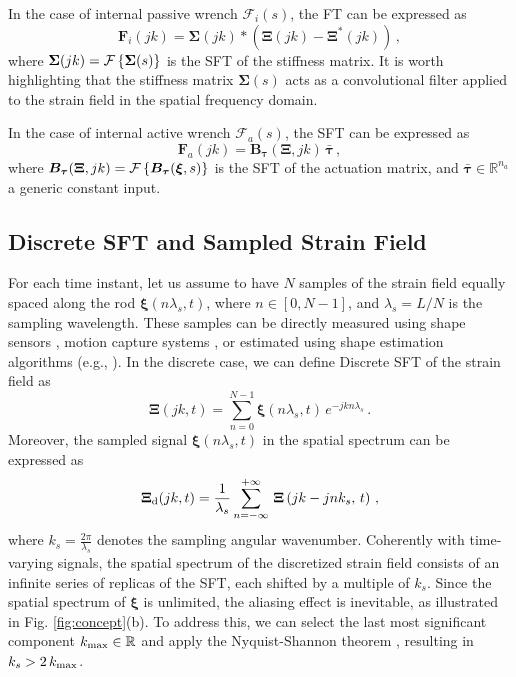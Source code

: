 In the case of internal passive wrench $\bm{\mathcal{F}}_i(s)$, the \ac{FT} can be expressed as
\begin{equation} \label{eq:internal_passive_static_ft}
    \bm{F}_i(j k) = \bm{\Sigma}(jk) \ast \left(\bm{\Xi}(jk) - \bm{\Xi}^{*}(jk) \right) \, ,
\end{equation}
where $\bm{\Sigma}(jk) = \mathcal{F}\left\{\bm{\Sigma}(s)\right\}$ is the \ac{SFT} of the stiffness matrix. It is worth highlighting that the stiffness matrix $\bm{\Sigma}(s)$ acts as a convolutional filter applied to the strain field in the spatial frequency domain.

In the case of internal active wrench $\bm{\mathcal{F}}_a(s)$, the \ac{SFT} can be expressed as
\begin{equation}
    \bm{F}_a(j k) = \bm{B}_{\bm{\tau}}(\bm{\Xi}, jk) \, \bar{\bm{\tau}} \, ,
\end{equation}
where $\bm{B}_{\bm{\tau}}(\bm{\Xi}, jk) = \mathcal{F}\left\{\bm{B}_{\bm{\tau}}(\bm{\xi}, s)\right\}$ is the \ac{SFT} of the actuation matrix, and $\bar{\bm{\tau}} \in \mathbb{R}^{n_a}$ a generic constant input.

\subsection{Discrete \ac{SFT} and Sampled Strain Field}
For each time instant, let us assume to have $N$ samples of the strain field equally spaced along the rod $\bm{\xi}(n \lambda_s, t)$, where $n \in [0, N - 1]$, and $\lambda_s = L / N$ is the sampling wavelength. These samples can be directly measured using shape sensors \cite{floris2021fiber}, motion capture systems \cite{field2009motion}, or estimated using shape estimation algorithms (e.g., \cite{lilge2022continuum}).
%
In the discrete case, we can define Discrete \ac{SFT} of the strain field as
\begin{equation} \label{eq:discrete_spatial_fourier_transform}
    \bm{\Xi}(jk, t) = \sum_{n = 0}^{N - 1} \bm{\xi}(n \lambda_s, t) \, e^{-jk n \lambda_s} \, . 
\end{equation}
%
Moreover, the sampled signal $\bm{\xi}(n \lambda_s, t)$ in the spatial spectrum can be expressed as
\begin{equation} \label{eq:repetition_spectrum}
    \bm{\Xi}_{\textnormal{d}}(jk, t) = \frac{1}{\lambda_s} \sum_{n = - \infty}^{+ \infty} \, \bm{\Xi}\left(jk - j n k_s, \, t\right) \, ,
\end{equation}
where $k_s = \frac{2 \pi}{\lambda_s}$ denotes the sampling angular wavenumber. Coherently with time-varying signals, the spatial spectrum of the discretized strain field consists of an infinite series of replicas of the \ac{SFT}, each shifted by a multiple of $k_s$. Since the spatial spectrum of $\bm{\xi}$ is unlimited, the aliasing effect is inevitable, as illustrated in Fig. \ref{fig:concept}(b). 
 To address this, we can select the last most significant component $k_{\textnormal{max}} \in \mathbb{R}$ and apply the Nyquist-Shannon theorem \cite{shannon1949communication}, resulting in $k_s > 2 \, k_{\textnormal{max}}$.

